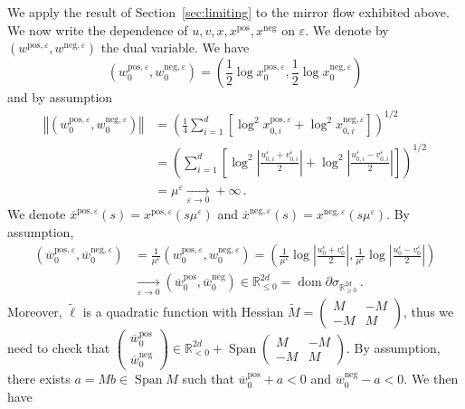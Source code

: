 \documentclass[11pt,english,reqno]{article}
\DeclareMathOperator{\Span}{Span}
\DeclareMathOperator{\dom}{dom}
\newcommand{\R}{\mathbb{R}}
\newcommand{\pos}{\text{pos}}
\renewcommand{\neg}{\text{neg}}
\renewcommand{\leq}{\leqslant}
\renewcommand{\geq}{\geqslant}
\theoremstyle{plain}
\theoremstyle{definition}
\theoremstyle{remark}
\numberwithin{equation}{section}
\begin{document}
We apply the result of Section~\ref{sec:limiting} to the mirror flow exhibited above. We now write the dependence of $u, v, x, x^\pos, x^\neg$ on $\varepsilon$. We denote by $(w^{\pos, \varepsilon}, w^{\neg, \varepsilon})$ the dual variable. We have
\begin{equation*}
	\left(w^{\pos, \varepsilon}_0, w^{\neg, \varepsilon}_0\right) = \left(\frac{1}{2} \log x_0^{\pos, \varepsilon}, \frac{1}{2} \log x_0^{\neg, \varepsilon}\right)
\end{equation*}
and by assumption
\begin{align*}
	\left\Vert \left(w^{\pos, \varepsilon}_0, w^{\neg, \varepsilon}_0\right)\right\Vert &= \left(\frac{1}{4} \sum_{i=1}^{d} \left[\log^2 x_{0,i}^{\pos, \varepsilon} + \log^2 x_{0,i}^{\neg, \varepsilon}\right]\right)^{1/2} \\
	&= \left(\sum_{i=1}^d \left[\log^2 \left\vert \frac{u^\varepsilon_{0,i} + v^\varepsilon_{0,i}}{2}\right\vert + \log^2 \left\vert \frac{u^\varepsilon_{0,i} - v^\varepsilon_{0,i}}{2} \right\vert\right]\right)^{1/2} \\
	&= \mu^\varepsilon \xrightarrow[\varepsilon \to 0]{} +\infty \, .
\end{align*}
We denote $\overline{x}^{\pos, \varepsilon}(s) = x^{\pos, \varepsilon}(s \mu^\varepsilon)$ and $\overline{x}^{\neg, \varepsilon}(s) = x^{\neg, \varepsilon}(s \mu^\varepsilon)$. By assumption, 
\begin{align*}
	\left(\overline{w}_0^{\pos, \varepsilon}, \overline{w}_0^{\neg, \varepsilon}\right) &= \frac{1}{\mu^\varepsilon}\left(w_0^{\pos,\varepsilon},w_0^{\neg,\varepsilon}\right) = \left(\frac{1}{\mu^\varepsilon} \log \left\vert \frac{u^\varepsilon_{0} + v^\varepsilon_{0}}{2}\right\vert, \frac{1}{\mu^\varepsilon} \log \left\vert \frac{u^\varepsilon_{0} - v^\varepsilon_{0}}{2} \right\vert\right) \\
	&\xrightarrow[\varepsilon \to 0]{} (\overline{w}_0^{\pos}, \overline{w}_0^{\neg}) \in \R^{2d}_{\leq 0} = \dom \partial \sigma_{\R^{2d}_{\geq 0}} \, . 
\end{align*}
Moreover, $\widetilde{\ell}$ is a quadratic function with Hessian $\widetilde{M} = \begin{pmatrix} M & -M \\ -M & M \end{pmatrix}$, thus we need to check that $\begin{pmatrix}\overline{w}_0^{\pos} \\ \overline{w}_0^{\neg}\end{pmatrix} \in \R^{2d}_{<0} + \Span \begin{pmatrix} M & -M \\ -M & M \end{pmatrix}$. By assumption, there exists $a = Mb \in \Span M$ such that $\overline{w}_0^{\pos} + a < 0$ and $\overline{w}_0^{\neg} - a < 0$. We then have
\end{document}
